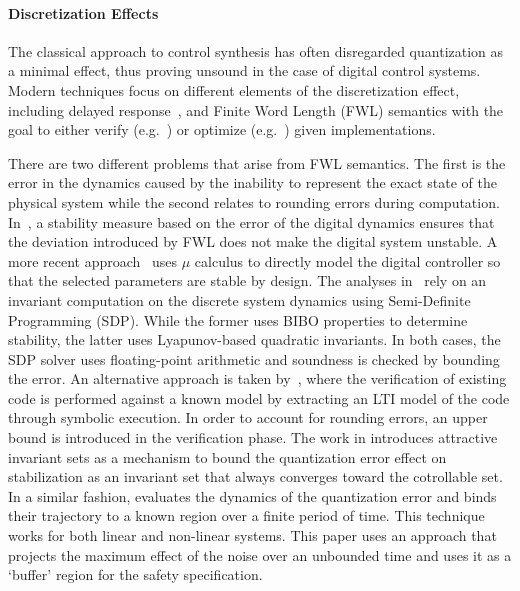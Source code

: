 \documentclass[runningheads,a4paper]{llncs}
\begin{document}
\paragraph{Discretization Effects}

The classical approach to control synthesis has often disregarded
quantization as a minimal effect, thus proving unsound in the case of digital control systems.
Modern techniques focus on different elements of the discretization effect, including delayed
response~\cite{Duggirala2015}, and Finite Word Length (FWL) semantics with
the goal to either verify (e.g.~\cite{daes20161}) or optimize
(e.g.~\cite{oudjida2014design}) given implementations.

There are two different problems that arise from FWL semantics.  The first
is the error in the dynamics caused by the inability to represent the exact
state of the physical system while the second relates to rounding errors
during computation.  In~\cite{fialho1994stability}, a stability measure
based on the error of the digital dynamics ensures that the deviation
introduced by FWL does not make the digital system unstable.  A more recent
approach~\cite{DBLP:journals/automatica/WuLCC09} uses $\mu$ calculus to
directly model the digital controller so that the selected parameters are
stable by design.  The analyses
in~\cite{DBLP:conf/hybrid/WangGRJF16,DBLP:conf/hybrid/RouxJG15} rely on an
invariant computation on the discrete system dynamics using Semi-Definite
Programming (SDP).  While the former uses BIBO properties to determine
stability, the latter uses Lyapunov-based quadratic invariants.  In both
cases, the SDP solver uses floating-point arithmetic and soundness is
checked by bounding the error.  An alternative approach is taken
by~\cite{park2016scalable}, where the verification of existing code is
performed against a known model by extracting an LTI model of the code
through symbolic execution.  In order to account for rounding errors, an
upper bound is introduced in the verification phase.
The work in \cite{picasso2002construction,picasso2003stabilization} introduces
attractive invariant sets as a mechanism to bound the quantization error effect
on stabilization as an invariant set that always converges toward the cotrollable
set. In a similar fashion, \cite{liberzon2003hybrid} evaluates the dynamics of the
quantization error and binds their trajectory to a known region over a finite
period of time. This technique works for both linear and non-linear systems.
This paper uses an approach that projects the maximum effect of the noise over
an unbounded time and uses it as a `buffer' region for the safety specification.
\end{document}
